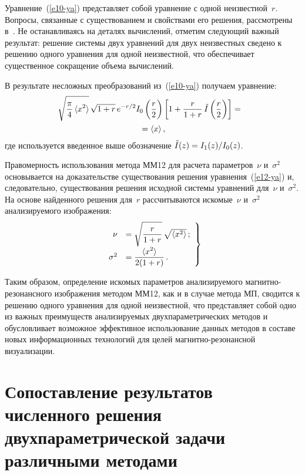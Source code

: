 \begin{multicols}{2}
    Уравнение~(\ref{e10-ya}) представляет собой уравнение с одной неизвестной~$r$.
Вопросы, связанные с существованием и свойствами его решения, рас\-смот\-ре\-ны
в~\cite{18-ya}. Не останавливаясь на деталях вычислений, отметим следующий важный
результат: решение системы двух уравнений для двух неизвестных сведено к решению
одного уравнения для одной неизвестной, что обеспечивает существенное сокращение
объема вычислений.

    В результате несложных преобразований из~(\ref{e10-ya}) получаем уравнение:
    \begin{multline}
   \hspace*{-4.6pt}\sqrt{\displaystyle\frac{\displaystyle \pi\mathstrut}{\displaystyle 4\mathstrut}\,\langle x^2\rangle}\,\sqrt{1+r}\, e^{-r/2} I_0 \left( \displaystyle\frac{\displaystyle r\mathstrut}{\displaystyle 2\mathstrut}\right) \left[
1+\displaystyle\frac{\displaystyle r\mathstrut}{\displaystyle 1+r\mathstrut}\,\tilde{I}\left( \displaystyle\frac{\displaystyle r\mathstrut}{\displaystyle 2\mathstrut}\right)\right] ={}\\
{}=\langle x\rangle\,,
    \label{e12-ya}
    \end{multline}
где используется введенное выше обозначение  $\tilde{I} (z) \hm= I_1(z)/I_0(z)$.

    Правомерность использования метода ММ12 для расчета параметров~$\nu$
и~$\sigma^2$ основывается на доказательстве существования решения
уравнения~(\ref{e12-ya}) и, следовательно, существования решения исходной системы
уравнений для~$\nu$ и~$\sigma^2$. На основе найден\-но\-го решения для~$r$ рассчитываются
искомые~$\nu$ и~$\sigma^2$ анализируемого изображения:
    \begin{equation}
    \left.
    \begin{array}{rl}
    \nu &= \sqrt{\displaystyle\frac{\displaystyle r\mathstrut}{\displaystyle 1+r\mathstrut}}\,\sqrt{\langle x^2\rangle}\,;\\[9pt]
    \sigma^2 &= \displaystyle\frac{\displaystyle \langle x^2\rangle\mathstrut}{\displaystyle 2(1+r)\mathstrut}\,.
    \end{array}
    \right\}
    \label{e13-ya}
    \end{equation}

     Таким образом, определение искомых па\-ра\-мет\-ров анализируемого
     магнитно-ре\-зо\-нансного изоб\-ра\-же\-ния методом ММ12, как и в случае метода МП, сводится к
решению одного уравнения для одной неизвестной, что представляет собой одно из
важных преимуществ анализируемых двухпараметрических методов и обусловливает
возможное эффективное использование данных методов в составе новых
информационных технологий для целей маг\-нит\-но-ре\-зо\-нанс\-ной визуализации.

\section{Сопоставление результатов численного решения
двухпараметрической задачи различными методами }


\end{multicols}
